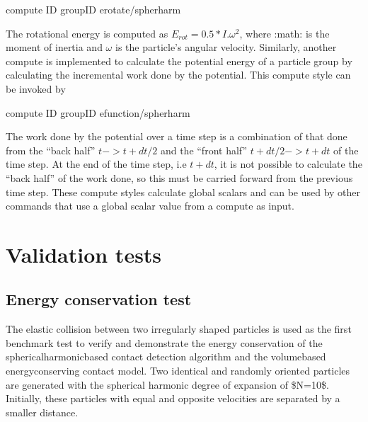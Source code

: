 \documentclass[letterpaper,10pt,english]{sphinxmanual}
\begin{document}
\begin{sphinxVerbatim}[commandchars=\\\{\}]
compute ID group\PYGZhy{}ID erotate/spherharm
\end{sphinxVerbatim}

\sphinxAtStartPar
The rotational energy is computed as \(E_{rot} = 0.5*I.\omega^2\), where :math:  is the moment of inertia  and \(\omega\) is the particle’s angular velocity. Similarly, another compute is implemented to calculate the potential energy of a particle group by calculating the incremental work done by the potential. This compute style can be invoked by

\begin{sphinxVerbatim}[commandchars=\\\{\}]
compute ID group\PYGZhy{}ID efunction/spherharm
\end{sphinxVerbatim}

\sphinxAtStartPar
The work done by the potential over a time step is a combination of that done from the “back half” \(t -> t+dt/2\) and the “front half” \(t+dt/2->t+dt\) of the time step. At the end of the time step, i.e \(t+dt\), it is not possible to calculate the “back half” of the work done, so this must be carried forward from the previous time step.
These compute styles calculate global scalars and can be used by other commands that use a global scalar value from a compute as input.

\sphinxstepscope


\section{Validation tests}
\label{\detokenize{Sections/4_validation:validation-tests}}\label{\detokenize{Sections/4_validation::doc}}

\subsection{Energy conservation test}
\label{\detokenize{Sections/4_validation:energy-conservation-test}}
\sphinxAtStartPar
The elastic collision between two irregularly shaped particles is used as the first benchmark test to verify and demonstrate the energy conservation of the spherical\sphinxhyphen{}harmonic\sphinxhyphen{}based contact detection algorithm and the volume\sphinxhyphen{}based energy\sphinxhyphen{}conserving contact model.  Two identical and randomly oriented particles are generated with the spherical harmonic degree of expansion of \$N=10\$. Initially, these particles with equal and opposite velocities are separated by a smaller distance.
\end{document}

